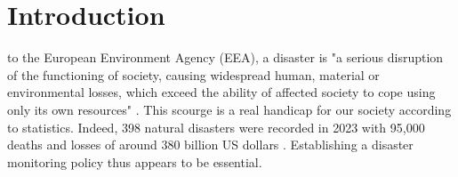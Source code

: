 \documentclass[12pt, onecolumn, journal]{IEEEtran}
\begin{document}
\maketitle


\IEEEdisplaynontitleabstractindextext







%
\IEEEpeerreviewmaketitle



\section{Introduction}
% 
% 
% 
% 
 to the European Environment Agency (EEA), a disaster is "a serious disruption of the functioning of society, causing widespread human, material or environmental losses, which exceed the ability of affected society to cope using only its own resources" \cite{noauthor_disaster_nodate}. This scourge is a real handicap for our society according to statistics. Indeed, 398 natural disasters were recorded in 2023  with 95,000 deaths and losses of around 380 billion US dollars \cite{burgueno_salas_global_nodate} \cite{noauthor_number_nodate}. Establishing a disaster monitoring policy thus appears to be essential. 
\end{document}
